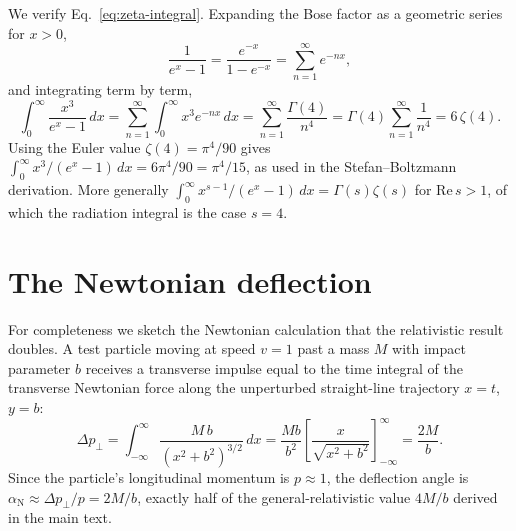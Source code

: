 \documentclass[10pt]{article}
\theoremstyle{definition}
\theoremstyle{remark}
\begin{document}
We verify Eq.~\eqref{eq:zeta-integral}. Expanding the Bose factor as a geometric series for $x > 0$,
\begin{equation}
\frac{1}{e^x - 1} = \frac{e^{-x}}{1 - e^{-x}} = \sum_{n=1}^{\infty} e^{-nx},
\end{equation}
and integrating term by term,
\begin{equation}
\int_0^\infty \frac{x^3}{e^x-1}\,dx = \sum_{n=1}^\infty \int_0^\infty x^3 e^{-nx}\,dx = \sum_{n=1}^\infty \frac{\Gamma(4)}{n^4} = \Gamma(4)\sum_{n=1}^\infty \frac{1}{n^4} = 6\,\zeta(4).
\end{equation}
Using the Euler value $\zeta(4) = \pi^4/90$ gives $\int_0^\infty x^3/(e^x-1)\,dx = 6\pi^4/90 = \pi^4/15$, as used in the Stefan--Boltzmann derivation. More generally $\int_0^\infty x^{s-1}/(e^x-1)\,dx = \Gamma(s)\zeta(s)$ for $\mathrm{Re}\,s > 1$, of which the radiation integral is the case $s = 4$.

\section{The Newtonian deflection}\label{app:newton}

For completeness we sketch the Newtonian calculation that the relativistic result doubles. A test particle moving at speed $v = 1$ past a mass $M$ with impact parameter $b$ receives a transverse impulse equal to the time integral of the transverse Newtonian force along the unperturbed straight-line trajectory $x = t$, $y = b$:
\begin{equation}
\Delta p_\perp = \int_{-\infty}^{\infty} \frac{M\,b}{(x^2 + b^2)^{3/2}}\,dx = \frac{Mb}{b^2}\left[\frac{x}{\sqrt{x^2+b^2}}\right]_{-\infty}^{\infty} = \frac{2M}{b}.
\end{equation}
Since the particle's longitudinal momentum is $p \approx 1$, the deflection angle is $\alpha_{\mathrm{N}} \approx \Delta p_\perp / p = 2M/b$, exactly half of the general-relativistic value $4M/b$ derived in the main text.
\end{document}
